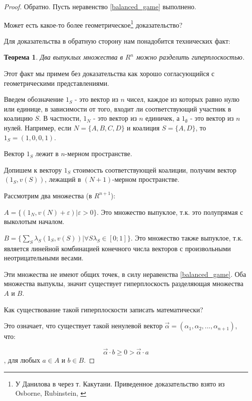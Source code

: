 \documentclass[pdftex,12pt,a4paper]{article}
\numberwithin{equation}{page} %
\newtheorem{theorem}[equation]{Теорема} %
\theoremstyle{definition} %
\theoremstyle{definition}
\theoremstyle{definition}
\begin{document}
\begin{proof}


Обратно. Пусть неравенство \ref{balanced_game} выполнено.

Может есть какое-то более геометрическое\footnote{У Данилова в \cite{danilov:lte} через т. Какутани. Приведенное доказательство взято из Osborne, Rubinstein, \cite{osborne:cgt}} доказательство?

Для доказательства в обратную сторону нам понадобится технических факт:
\begin{theorem}
Два выпуклых множества в $R^{n}$ можно разделить гиперплоскостью. 
\end{theorem}
Этот факт мы примем без доказательства как хорошо согласующийся с геометрическими представлениями.

Введем обозначение $1_{S}$ - это вектор из $n$ чисел, каждое из которых равно нулю или единице, в зависимости от того, входит ли соответствующий участник в коалицию $S$. В частности, $1_{N}$ - это вектор из $n$ единичек, а $1_{\emptyset}$ - это вектор из $n$ нулей. Например, если $N=\{A,B,C,D\}$ и коалиция $S=\{A,D\}$, то $1_{S}=(1,0,0,1)$.

Вектор $1_{S}$ лежит в $n$-мерном пространстве.

Допишем к вектору $1_{S}$ стоимость соответствующей коалиции, получим вектор $(1_{S},v(S))$, лежащий в $(N+1)$-мерном пространстве.

Рассмотрим два множества (в $R^{n+1}$):

$A=\{(1_{N},v(N)+\varepsilon)| \varepsilon>0\}$. Это множество выпуклое, т.к. это полупрямая с выколотым началом.

$B=\{\sum_{S} \lambda_{S} (1_{S},v(S)) | \forall S \lambda_{S}\in [0;1] \}$. Это множество также выпуклое, т.к. является линейной комбинацией конечного числа векторов с произвольными неотрицательными весами. 

Эти множества не имеют общих точек, в силу неравенства \ref{balanced_game}. Оба множества выпуклы, значит существует гиперплоскость разделяющая множества $A$ и $B$.

Как существование такой гиперплоскости записать математически?

Это означает, что существует такой ненулевой вектор $\vec{\alpha}=(\alpha_{1},\alpha_{2},...,\alpha_{n+1})$, что:

\begin{equation}
\label{hyperplane_eq}
	\vec{\alpha}\cdot b \geq 0 > \vec{\alpha}\cdot a
\end{equation},
для любых $a\in A$ и $b\in B$.


\end{proof}
\end{document}
